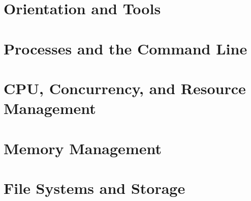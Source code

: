 \documentclass[11pt,oneside,a4paper]{report}
\begin{document}
\utpfrontmatter

\part{Orientation and Tools}



\part{Processes and the Command Line}




\part{CPU, Concurrency, and Resource Management}




\part{Memory Management}



\part{File Systems and Storage}



\end{document}
